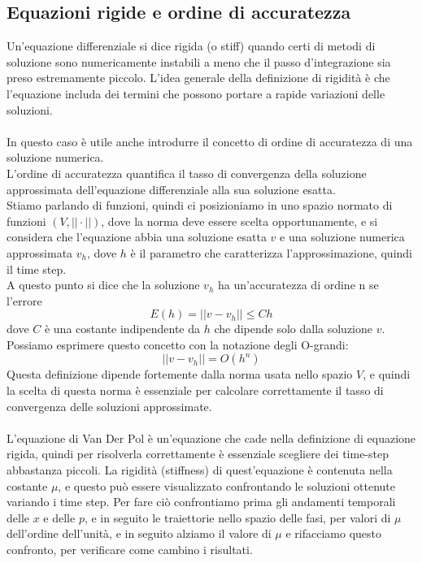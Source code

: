 \documentclass[12pt]{article}
\begin{document}
\subsection{Equazioni rigide e ordine di accuratezza}
Un'equazione differenziale si dice rigida (o stiff) quando certi di metodi di soluzione sono numericamente instabili a meno che il passo d'integrazione sia preso estremamente piccolo. L'idea generale della definizione di rigidità è che l'equazione includa dei termini che possono portare a rapide variazioni delle soluzioni. \\ \\
In questo caso è utile anche introdurre il concetto di ordine di accuratezza di una soluzione numerica. \\
L'ordine di accuratezza quantifica il tasso di convergenza della soluzione approssimata dell'equazione differenziale alla sua soluzione esatta. \\
Stiamo parlando di funzioni, quindi ci posizioniamo in uno spazio normato di funzioni $(V,||\cdot||)$, dove la norma deve essere scelta opportunamente, e si considera che l'equazione abbia una soluzione esatta $v$ e una soluzione numerica approssimata $v_h$, dove $h$ è il parametro che caratterizza l'approssimazione, quindi il time step. \\
A questo punto si dice che la soluzione $v_h$ ha un'accuratezza di ordine n se l'errore
\begin{equation}
	E(h) = ||v-v_h|| \leq Ch
\end{equation}
dove $C$ è una costante indipendente da $h$ che dipende solo dalla soluzione $v$. \\
Possiamo esprimere questo concetto con la notazione degli O-grandi:
\begin{equation}
	||v-v_h|| = O(h^n)
\end{equation}
Questa definizione dipende fortemente dalla norma usata nello spazio $V$, e quindi la scelta di questa norma è essenziale per calcolare correttamente il tasso di convergenza delle soluzioni approssimate. \\ \\
L'equazione di Van Der Pol è un'equazione che cade nella definizione di equazione rigida, quindi per risolverla correttamente è essenziale scegliere dei time-step abbastanza piccoli. La rigidità (stiffness) di quest'equazione è contenuta nella costante $\mu$, e questo può essere visualizzato confrontando le soluzioni ottenute variando i time step. Per fare ciò confrontiamo prima gli andamenti temporali delle $x$ e delle $p$, e in seguito le traiettorie nello spazio delle fasi, per valori di $\mu$ dell'ordine dell'unità, e in seguito alziamo il valore di $\mu$ e rifacciamo questo confronto, per verificare come cambino i risultati.
\end{document}
